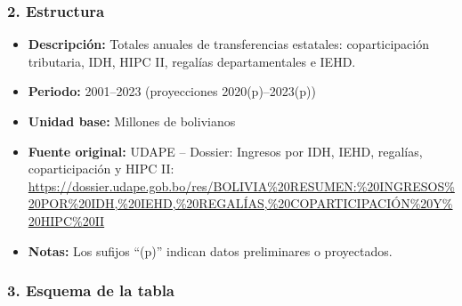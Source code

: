 \documentclass[12pt,a4paper]{article}
\begin{document}
\subsubsection*{2. Estructura}
\begin{itemize}
  \item \textbf{Descripción:} Totales anuales de transferencias estatales: coparticipación tributaria, IDH, HIPC II, regalías departamentales e IEHD.
  \item \textbf{Periodo:} 2001–2023 (proyecciones 2020(p)–2023(p))
  \item \textbf{Unidad base:} Millones de bolivianos
  \item \textbf{Fuente original:} UDAPE – Dossier: Ingresos por IDH, IEHD, regalías, coparticipación y HIPC II:\\
    \url{https://dossier.udape.gob.bo/res/BOLIVIA%20RESUMEN:%20INGRESOS%20POR%20IDH,%20IEHD,%20REGALÍAS,%20COPARTICIPACIÓN%20Y%20HIPC%20II}
  \item \textbf{Notas:} Los sufijos “(p)” indican datos preliminares o proyectados.
\end{itemize}

\subsubsection*{3. Esquema de la tabla}
\end{document}
